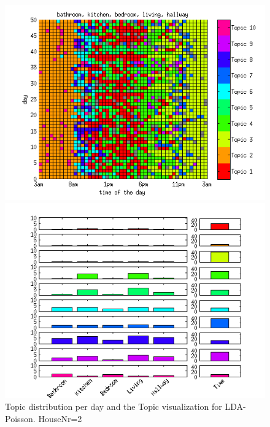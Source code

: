 \begin{figure}
 \centering
 \begin{minipage}[b]{0.45\linewidth}
  \centering
  \includegraphics[width=\textwidth]{Pictures/Pois/DayHN2TS48k20.png}
 \end{minipage}
 \begin{minipage}[b]{0.45\linewidth}
  \centering
  \includegraphics[width=\textwidth]{Pictures/Pois/TopHN2TS48k20.png}
 \end{minipage}
 \caption{Topic distribution per day and the Topic visualization for LDA-Poisson. HouseNr=2}
\end{figure}


